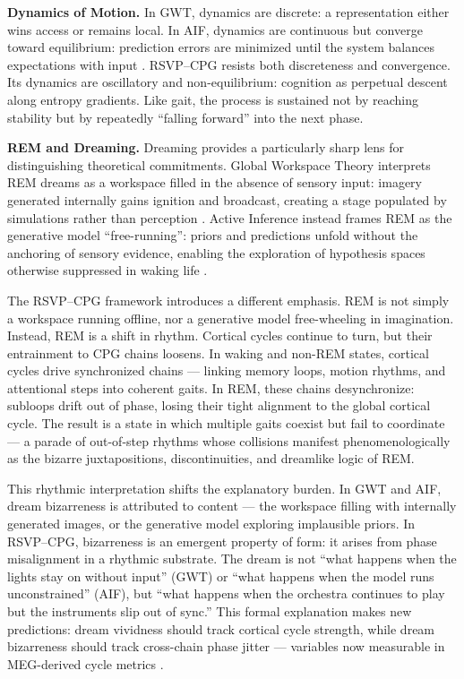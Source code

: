 \documentclass{article}
\begin{document}
\textbf{Dynamics of Motion.} In GWT, dynamics are discrete: a representation either wins access or remains local. In AIF, dynamics are continuous but converge toward equilibrium: prediction errors are minimized until the system balances expectations with input \citep{friston2010free}. RSVP--CPG resists both discreteness and convergence. Its dynamics are oscillatory and non-equilibrium: cognition as perpetual descent along entropy gradients. Like gait, the process is sustained not by reaching stability but by repeatedly “falling forward” into the next phase.

\textbf{REM and Dreaming.} Dreaming provides a particularly sharp lens for distinguishing theoretical commitments. Global Workspace Theory interprets REM dreams as a workspace filled in the absence of sensory input: imagery generated internally gains ignition and broadcast, creating a stage populated by simulations rather than perception \citep{dehaene2014consciousness}. Active Inference instead frames REM as the generative model “free-running”: priors and predictions unfold without the anchoring of sensory evidence, enabling the exploration of hypothesis spaces otherwise suppressed in waking life \citep{hobson2012waking}.

The RSVP--CPG framework introduces a different emphasis. REM is not simply a workspace running offline, nor a generative model free-wheeling in imagination. Instead, REM is a shift in rhythm. Cortical cycles continue to turn, but their entrainment to CPG chains loosens. In waking and non-REM states, cortical cycles drive synchronized chains — linking memory loops, motion rhythms, and attentional steps into coherent gaits. In REM, these chains desynchronize: subloops drift out of phase, losing their tight alignment to the global cortical cycle. The result is a state in which multiple gaits coexist but fail to coordinate — a parade of out-of-step rhythms whose collisions manifest phenomenologically as the bizarre juxtapositions, discontinuities, and dreamlike logic of REM.

This rhythmic interpretation shifts the explanatory burden. In GWT and AIF, dream bizarreness is attributed to content — the workspace filling with internally generated images, or the generative model exploring implausible priors. In RSVP--CPG, bizarreness is an emergent property of form: it arises from phase misalignment in a rhythmic substrate. The dream is not “what happens when the lights stay on without input” (GWT) or “what happens when the model runs unconstrained” (AIF), but “what happens when the orchestra continues to play but the instruments slip out of sync.” This formal explanation makes new predictions: dream vividness should track cortical cycle strength, while dream bizarreness should track cross-chain phase jitter — variables now measurable in MEG-derived cycle metrics \citep{van2025cortical}.
\end{document}
